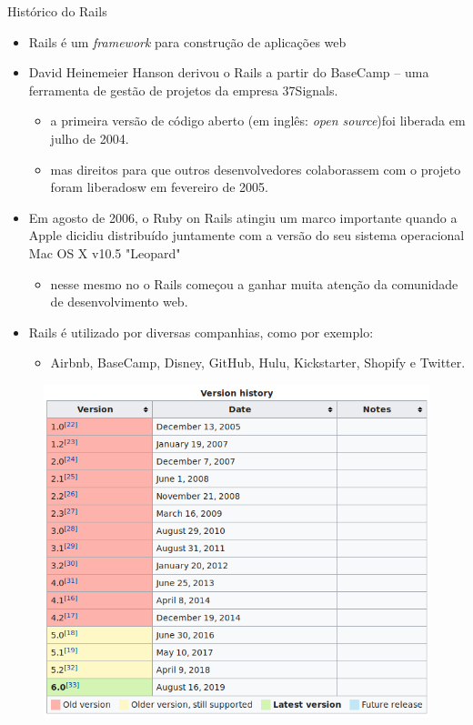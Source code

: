 \begin{frame}{Histórico do Rails}
  \begin{itemize}
  	\item Rails é um \textit{framework} para construção de aplicações web
    \item David Heinemeier Hanson \alert{derivou} o Rails a partir do BaseCamp --
      uma ferramenta de gestão de projetos da empresa 37Signals.
    \begin{itemize}
	\item a primeira versão de código aberto (em inglês: \textit{open source})foi liberada em 
	  julho de 2004.
	\item mas direitos para que outros desenvolvedores \alert{colaborassem} com o projeto foram liberadosw
	  em fevereiro de 2005.
    \end{itemize}
    \item Em agosto de 2006, o Ruby on Rails atingiu um \alert{marco importante} quando a Apple dicidiu
      distribuído juntamente com a versão do seu sistema operacional Mac OS X v10.5 "Leopard"
    \begin{itemize}
     \item nesse mesmo no o Rails começou a ganhar muita atenção da comunidade de desenvolvimento web.
    \end{itemize}
    \item Rails é utilizado por diversas companhias, como por exemplo:
    \begin{itemize}
     \item Airbnb, BaseCamp, Disney, GitHub, Hulu, Kickstarter, Shopify e Twitter.
    \end{itemize}

  \end{itemize}

  \begin{figure}[h]
    \includegraphics[scale=0.3]{imagens/rails-history.png}  
  \end{figure}
\end{frame}
